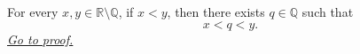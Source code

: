 \begin{theorem}
\label{thm:rational-between-any-two-irrationals}
For every $x,y\in\mathbb{R}\setminus\mathbb{Q}$, if $x<y$, then there exists
$q\in\mathbb{Q}$ such that
\[
  x<q<y.
\]
\hyperref[prf:rational-between-any-two-irrationals]{\textit{Go to proof.}}
\end{theorem}